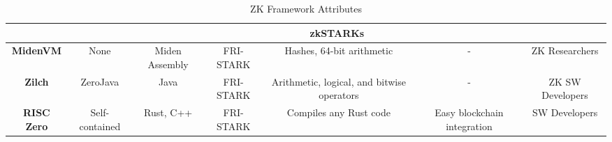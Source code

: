 \begin{sidewaystable*}[t!]
{\begin{tabular}{ccccccc}
   \midrule
   & \multicolumn{6}{c}{\textbf{zkSTARKs}} \\
   \midrule

   \textbf{MidenVM \cite{PolygonMiden2023MidenVM}} & None & Miden Assembly & FRI-STARK & Hashes, 64-bit arithmetic & - & ZK Researchers \\
   \textbf{Zilch \cite{TrustworthyComputing2023Zilch}} & ZeroJava \cite{} & Java & FRI-STARK & Arithmetic, logical, and bitwise operators & - & ZK SW Developers \\
   \textbf{RISC Zero \cite{RISCZero2023DeveloperDocs}} & Self-contained & Rust, C++ & FRI-STARK & Compiles any Rust code & Easy blockchain integration & SW Developers \\

   \bottomrule
   \end{tabular}}
   \caption{ZK Framework Attributes}
       \label{tab:description}
\end{sidewaystable*}